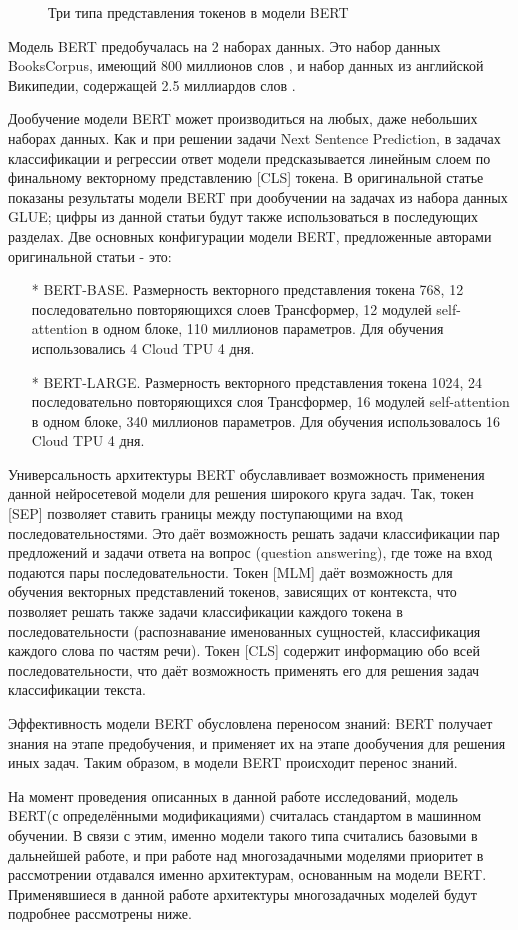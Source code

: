 \begin{figure}[ht]
  \caption{Три типа представления токенов в модели BERT}\label{fig:Transformer5-BERTTokenTypes}
\end{figure}
Модель BERT предобучалась на 2 наборах данных. Это набор данных BooksCorpus, имеющий 800 миллионов слов \cite{Zhu_Kiros_Zemel_Salakhutdinov_Urtasun_Torralba_Fidler_2015}, и набор данных из английской Википедии, содержащей 2.5 миллиардов слов \cite{Devlin_Chang_Lee_Toutanova_2019}. 

Дообучение модели BERT может производиться на любых, даже небольших наборах данных. Как и при решении задачи Next Sentence Prediction, в задачах классификации и регрессии ответ модели предсказывается линейным слоем по финальному векторному представлению [CLS] токена. В оригинальной статье показаны результаты модели BERT при дообучении на задачах из набора данных GLUE; цифры из данной статьи будут также использоваться в последующих разделах. 
Две основных конфигурации модели BERT, предложенные авторами оригинальной статьи - это:
\begin{itemize}
\item[*] BERT-BASE. Размерность векторного представления токена 768, 12 последовательно повторяющихся слоев Трансформер, 12 модулей self-attention в одном блоке, 110 миллионов параметров. Для обучения использовались 4 Cloud TPU 4 дня. 
\item[*] BERT-LARGE. Размерность векторного представления токена 1024, 24 последовательно повторяющихся слоя Трансформер, 16 модулей self-attention в одном блоке, 340 миллионов параметров. Для обучения использовалось 16 Cloud TPU 4 дня. 
\end{itemize}

Универсальность архитектуры BERT обуславливает возможность применения данной нейросетевой модели для решения широкого круга задач. Так, токен [SEP] позволяет ставить границы между поступающими на вход последовательностями. Это даёт возможность решать задачи классификации пар предложений и задачи ответа на вопрос (question answering), где тоже на вход подаются пары последовательности. Токен [MLM] даёт возможность для обучения векторных представлений токенов, зависящих от контекста, что позволяет решать также задачи классификации каждого токена в последовательности (распознавание именованных сущностей, классификация каждого слова по частям речи). Токен [CLS] содержит информацию обо всей последовательности, что даёт возможность применять его для решения задач классификации текста. 

Эффективность модели BERT обусловлена переносом знаний: BERT получает знания на этапе предобучения, и применяет их на этапе дообучения для решения иных задач. Таким образом, в модели BERT происходит перенос знаний. 

На момент проведения описанных в данной работе исследований, модель BERT(с определёнными модификациями) считалась стандартом в машинном обучении. В связи с этим, именно модели такого типа считались базовыми в дальнейшей работе, и при работе над многозадачными моделями приоритет в рассмотрении отдавался именно архитектурам, основанным на модели BERT. Применявшиеся в данной работе архитектуры многозадачных моделей будут подробнее рассмотрены ниже. 

